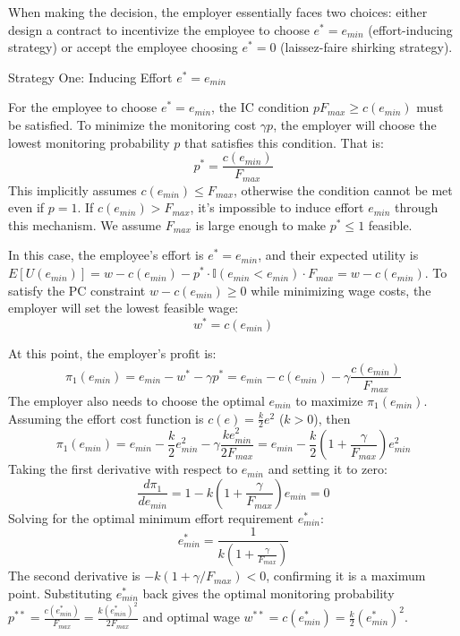 When making the decision, the employer essentially faces two choices: either design a contract to incentivize the employee to choose $e^*=e_{min}$ (effort-inducing strategy) or accept the employee choosing $e^*=0$ (laissez-faire shirking strategy).

{Strategy One: Inducing Effort $e^* = e_{min}$}

For the employee to choose $e^* = e_{min}$, the IC condition $p F_{max} \ge c(e_{min})$ must be satisfied. To minimize the monitoring cost $\gamma p$, the employer will choose the lowest monitoring probability $p$ that satisfies this condition. That is:
\begin{equation} \label{eq:optimal_p}
p^* = \frac{c(e_{min})}{F_{max}}
\end{equation}
This implicitly assumes $c(e_{min}) \le F_{max}$, otherwise the condition cannot be met even if $p=1$. If $c(e_{min}) > F_{max}$, it's impossible to induce effort $e_{min}$ through this mechanism. We assume $F_{max}$ is large enough to make $p^* \le 1$ feasible.

In this case, the employee's effort is $e^*=e_{min}$, and their expected utility is $E[U(e_{min})] = w - c(e_{min}) - p^* \cdot \mathbb{I}(e_{min} < e_{min}) \cdot F_{max} = w - c(e_{min})$.
To satisfy the PC constraint $w - c(e_{min}) \ge 0$ while minimizing wage costs, the employer will set the lowest feasible wage:
\begin{equation} \label{eq:optimal_w_emin}
w^* = c(e_{min})
\end{equation}

At this point, the employer's profit is:
\begin{equation} \label{eq:profit_emin}
\pi_1(e_{min}) = e_{min} - w^* - \gamma p^* = e_{min} - c(e_{min}) - \gamma \frac{c(e_{min})}{F_{max}}
\end{equation}
The employer also needs to choose the optimal $e_{min}$ to maximize $\pi_1(e_{min})$. Assuming the effort cost function is $c(e) = \frac{k}{2}e^2$ ($k>0$), then
\begin{equation}
\pi_1(e_{min}) = e_{min} - \frac{k}{2}e_{min}^2 - \gamma \frac{k e_{min}^2}{2 F_{max}} = e_{min} - \frac{k}{2} \left( 1 + \frac{\gamma}{F_{max}} \right) e_{min}^2
\end{equation}
Taking the first derivative with respect to $e_{min}$ and setting it to zero:
\begin{equation}
\frac{d\pi_1}{de_{min}} = 1 - k \left( 1 + \frac{\gamma}{F_{max}} \right) e_{min} = 0
\end{equation}
Solving for the optimal minimum effort requirement $e_{min}^*$:
\begin{equation} \label{eq:optimal_emin}
e_{min}^* = \frac{1}{k \left( 1 + \frac{\gamma}{F_{max}} \right)}
\end{equation}
The second derivative is $-k(1 + \gamma/F_{max}) < 0$, confirming it is a maximum point.
Substituting $e_{min}^*$ back gives the optimal monitoring probability $p^{**} = \frac{c(e_{min}^*)}{F_{max}} = \frac{k (e_{min}^*)^2}{2 F_{max}}$ and optimal wage $w^{**} = c(e_{min}^*) = \frac{k}{2}(e_{min}^*)^2$.

